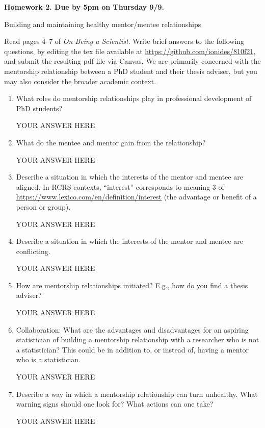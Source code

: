 \documentclass[12pt]{article}
\begin{document}
\begin{center}\bf
Homework 2. Due by 5pm on Thursday 9/9.

Building and maintaining healthy mentor/mentee relationships

\end{center}

Read pages 4--7 of {\em On Being a Scientist}. Write brief answers to the following questions, by editing the tex file available at \url{https://github.com/ionides/810f21}, and submit the resulting pdf file via Canvas. We are primarily concerned with the mentorship relationship between a PhD student and their thesis adviser, but you may also consider the broader academic context.

\begin{enumerate}
\item What roles do mentorship relationships play in professional development of PhD students? 

YOUR ANSWER HERE

\item What do the mentee and mentor gain from the relationship?

YOUR ANSWER HERE

\item Describe a situation in which the interests of the mentor and mentee are aligned. In RCRS contexts, ``interest'' corresponds to meaning 3 of \url{https://www.lexico.com/en/definition/interest} (the advantage or benefit of a person or group).

YOUR ANSWER HERE

\item Describe a situation in which the interests of the mentor and mentee are conflicting. 

YOUR ANSWER HERE

\item How are mentorship relationships initiated? E.g., how do you find a thesis adviser?

YOUR ANSWER HERE

\item Collaboration: What are the advantages and disadvantages for an aspiring statistician of building a mentorship relationship with a researcher who is not a statistician? This could be in addition to, or instead of, having a mentor who is a statistician.

YOUR ANSWER HERE

\item Describe a way in which a mentorship relationship can turn unhealthy. What warning signs should one look for? What actions can one take?

YOUR ANSWER HERE

\end{enumerate}
\end{document}
